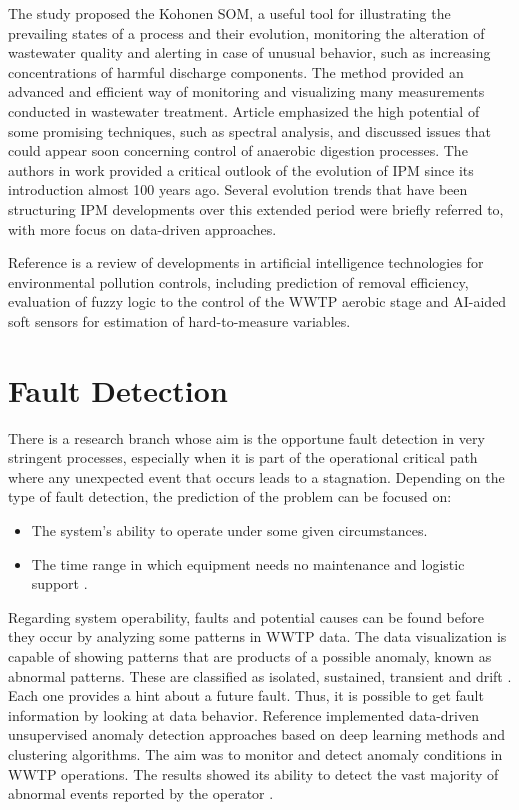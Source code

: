 The study \cite{Liukkonen2013} proposed the Kohonen \ac{SOM}, a useful tool for illustrating the prevailing states of a process and their evolution, monitoring the alteration of wastewater quality and alerting in case of unusual behavior, such as increasing concentrations of harmful discharge components. The method provided an advanced and efficient way of monitoring and visualizing many measurements conducted in wastewater treatment. Article \cite{Jimenez2015} emphasized the high potential of some promising techniques, such as spectral analysis, and discussed issues that could appear soon concerning control of anaerobic digestion  processes. The authors in work \cite{Reis2017} provided a critical outlook of the evolution of \ac{IPM} since its introduction almost 100 years ago. Several evolution trends that have been structuring \ac{IPM} developments over this extended period were briefly referred to, with more focus on data-driven approaches.

Reference \cite{Ye2020} is a review of developments in artificial intelligence technologies for environmental pollution controls, including prediction of removal efficiency, evaluation of fuzzy logic to the control of the \ac{WWTP} aerobic stage and \ac{AI}-aided soft sensors for estimation of hard-to-measure variables. 

\section{Fault Detection}
\label{s:RelatedWorks-faultDetection}

There is a research branch whose aim is the opportune fault detection in very stringent processes, especially when it is part of the operational critical path where any unexpected event that occurs leads to a stagnation. Depending on the type of fault detection, the prediction of the problem can be focused on:

\begin{itemize}
 \item	The system’s ability to operate under some given circumstances.
 \item	The time range in which equipment needs no maintenance and logistic support \cite{Alsina2018}.
\end{itemize}


Regarding system operability, faults and potential causes can be found before they occur by analyzing some patterns in \ac{WWTP} data. The data visualization is capable of showing patterns that are products of a possible anomaly, known as abnormal patterns. These are classified as isolated, sustained, transient and drift \cite{Newhart2019}. Each one provides a hint about a future fault. Thus, it is possible to get fault information by looking at data behavior. Reference \cite{Dairi2019} implemented data-driven unsupervised anomaly detection approaches based on deep learning methods and clustering algorithms. The aim was to monitor and detect anomaly conditions in \ac{WWTP} operations. The results showed its ability to detect the vast majority of abnormal events reported by the operator \cite{Dairi2019}. 

